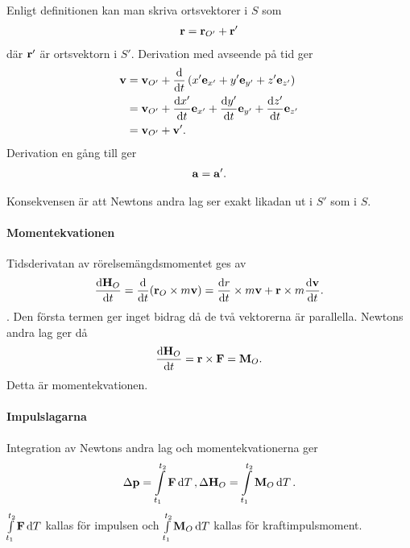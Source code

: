 Enligt definitionen kan man skriva ortsvektorer i $S$ som
\begin{align*}
	\vb{r} = \vb{r}_{O'} + \vb{r}'
\end{align*}
där $\vb{r}'$ är ortsvektorn i $S'$. Derivation med avseende på tid ger
\begin{align*}
	\vb{v} &= \vb{v}_{O'} + \dv{t}\left(x'\vb{e}_{x'} + y'\vb{e}_{y'} + z'\vb{e}_{z'}\right) \\
	       &= \vb{v}_{O'} + \dv{x'}{t}\vb{e}_{x'} + \dv{y'}{t}\vb{e}_{y'} + \dv{z'}{t}\vb{e}_{z'} \\
	       &= \vb{v}_{O'} + \vb{v}'.
\end{align*}
Derivation en gång till ger
\begin{align*}
	\vb{a} = \vb{a}'.
\end{align*}

Konsekvensen är att Newtons andra lag ser exakt likadan ut i $S'$ som i $S$.

\paragraph{Momentekvationen}
Tidsderivatan av rörelsemängdsmomentet ges av
\begin{align*}
	\dv{\vb{H}_{O}}{t} = \dv{t}(\vb{r}_{O}\times m\vb{v}) = \dv{r}{t}\times m\vb{v} + \vb{r}\times m\dv{\vb{v}}{t}.
\end{align*}.
Den första termen ger inget bidrag då de två vektorerna är parallella. Newtons andra lag ger då
\begin{align*}
	\dv{\vb{H}_{O}}{t} = \vb{r}\times\vb{F} = \vb{M}_{O}.
\end{align*}
Detta är momentekvationen.

\paragraph{Impulslagarna}
Integration av Newtons andra lag och momentekvationerna ger
\begin{align*}
	\Delta\vb{p} = \int\limits_{t_1}^{t_2}\vb{F}\dd{T}, \Delta\vb{H}_{O} = \int\limits_{t_1}^{t_2}\vb{M}_{O}\dd{T}.
\end{align*}
$\int\limits_{t_1}^{t_2}\vb{F}\dd{T}$ kallas för impulsen och $\int\limits_{t_1}^{t_2}\vb{M}_{O}\dd{T}$ kallas för kraftimpulsmoment.